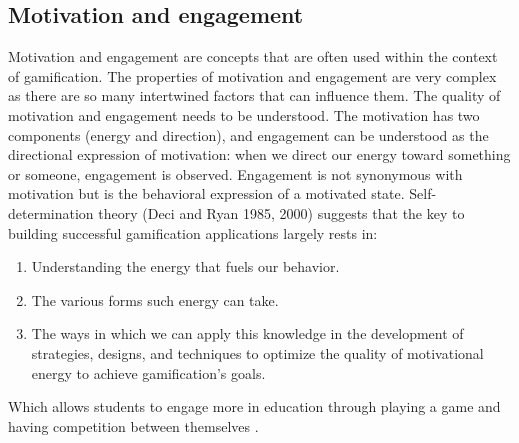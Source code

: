 \documentclass[../main.tex]{subfiles}
\begin{document}
\subsection{Motivation and engagement}
Motivation and engagement are concepts that are often used within the context of gamification. The properties of motivation and engagement are very complex as there are so many intertwined factors that can influence them. The quality of motivation and engagement needs to be understood. The motivation has two components (energy and direction), and engagement can be understood as the directional expression of motivation: when we direct our energy toward something or someone, engagement is observed. Engagement is not synonymous with motivation but is the behavioral expression of a motivated state.
Self-determination theory (Deci and Ryan 1985, 2000) \cite{8} suggests that the key to building successful gamification applications largely rests in:
\begin{enumerate}
    \item Understanding the energy that fuels our behavior.
    \item The various forms such energy can take.
    \item The ways in which we can apply this knowledge in the development of strategies, designs, and techniques to optimize the quality of motivational energy to achieve gamification’s goals.
\end{enumerate}
Which allows students to engage more in education through playing a game and having competition between themselves \cite{9}.
\end{document}
